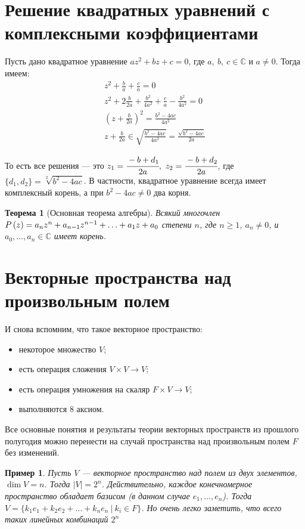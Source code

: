 \documentclass[a4paper,12pt]{article}
\newcommand*{\hm}[1]{#1\nobreak\discretionary{}
{\hbox{$\mathsurround=0pt #1$}}{}}
\newtheorem*{Examples}{Пример}
\newtheorem*{Theorem}{Теорема}
\begin{document}
\section*{Решение квадратных уравнений с комплексными коэффициентами}

Пусть дано квадратное уравнение $az^2+bz+c=0$, где $a,\ b,\ c\in\mathbb{C}$ и 	$ a \neq 0$. Тогда имеем:
\begin{gather*}
    z^2+\frac{b}{a}+\frac{c}{a} = 0\\
    z^2+2\frac{b}{2a}+\frac{b^2}{4a^2}+\frac{c}{a}-\frac{b^2}{4a^2} = 0\\
    \left(z+\frac{b}{2a}\right)^2=\frac{b^2-4ac}{4a^2}\\
    z+\frac{b}{2a} \in \sqrt{\frac{b^2-4ac}{4a^2}}=\frac{\sqrt{b^2-4ac}}{2a}
\end{gather*}

То есть все решения --- это $z_1 = \cfrac{-b+d_1}{2a},\ z_2 = \cfrac{-b+d_2}{2a}$, где $\{d_1,d_2\} = \sqrt[2]{b^2-4ac}$. В частности, квадратное уравнение всегда имеет комплексный корень, а при $b^2-4ac\neq0$ два корня.

\begin{Theorem}[Основная теорема алгебры]
Всякий многочлен $P\left(z\right) = a_nz^n + a_{n-1}z^{n-1} + \ldots \hm{+} a_1z + a_0$ степени $n$, где $n \geqslant 1$, $a_n \neq 0$, и $a_0,\ldots,a_n \in \mathbb{C}$ имеет корень.
\end{Theorem}

\section{Векторные пространства над произвольным полем}

И снова вспомним, что такое векторное пространство:

\begin{itemize}
    \item некоторое множество $V$;
    \item есть операция сложения $V\times V\rightarrow V$;
    \item есть операция умножения на скаляр $F\times V\rightarrow V$;
    \item выполняются 8 аксиом.
\end{itemize}

Все основные понятия и результаты теории векторных пространств из прошлого полугодия можно перенести на случай пространства над произвольным полем $F$ без изменений.

\begin{Examples}
Пусть $V$ --- векторное пространство над полем из двух элементов, $\dim V = n$. Тогда $|V| = 2^n$. Действительно, каждое конечномерное пространство обладает базисом (в данном случае $e_1,\ldots,e_n$). Тогда $V = \{k_1e_1+k_2e_2+\ldots+k_ne_n\ |\ k_i\in F\}$. Но очень легко заметить, что всего таких линейных комбинаций $2^n$
\end{Examples}
\end{document}
